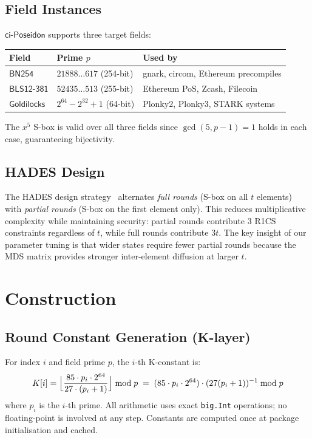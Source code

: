 \documentclass[preprint]{iacrtrans}
\newcommand{\BN}{\ensuremath{\mathsf{BN254}}}
\newcommand{\BLS}{\ensuremath{\mathsf{BLS12\text{-}381}}}
\newcommand{\GL}{\ensuremath{\mathsf{Goldilocks}}}
\newcommand{\ciposeidon}{\ensuremath{\mathsf{ci\text{-}Poseidon}}}
\begin{document}
\subsection{Field Instances}

\ciposeidon{} supports three target fields:

\begin{center}
\begin{tabular}{lll}
\toprule
Field & Prime $p$ & Used by \\
\midrule
$\BN$ & $21888\ldots617$ (254-bit) & gnark, circom, Ethereum precompiles \\
$\BLS$ & $52435\ldots513$ (255-bit) & Ethereum PoS, Zcash, Filecoin \\
$\GL$ & $2^{64} - 2^{32} + 1$ (64-bit) & Plonky2, Plonky3, STARK systems \\
\bottomrule
\end{tabular}
\end{center}

The $x^5$ S-box is valid over all three fields since $\gcd(5, p-1) = 1$ holds
in each case, guaranteeing bijectivity.

\subsection{HADES Design}

The HADES design strategy~\cite{GLRRS20} alternates \emph{full rounds}
(S-box on all $t$ elements) with \emph{partial rounds} (S-box on the first
element only). This reduces multiplicative complexity while maintaining
security: partial rounds contribute 3 R1CS constraints regardless of $t$,
while full rounds contribute $3t$. The key insight of our parameter tuning is
that wider states require fewer partial rounds because the MDS matrix provides
stronger inter-element diffusion at larger $t$.

\section{Construction}

\subsection{Round Constant Generation (K-layer)}

For index $i$ and field prime $p$, the $i$-th K-constant is:
\[
  K[i] = \Bigl\lfloor
    \frac{85 \cdot p_i \cdot 2^{64}}{27 \cdot (p_i + 1)}
  \Bigr\rfloor \bmod p
  \;=\;
  (85 \cdot p_i \cdot 2^{64}) \cdot (27(p_i+1))^{-1} \bmod p
\]
where $p_i$ is the $i$-th prime. All arithmetic uses exact \texttt{big.Int}
operations; no floating-point is involved at any step. Constants are computed
once at package initialisation and cached.
\end{document}
